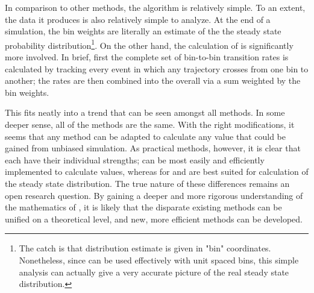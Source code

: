 In comparison to other  methods, the  algorithm is relatively simple. To an extent, the data it produces is also relatively simple to analyze. At the end of a  simulation, the bin weights are literally an estimate of the the steady state probability distribution\footnote{The catch is that distribution estimate is given in "bin" coordinates. Nonetheless, since  can be used effectively with unit spaced bins\supercite{Zhang:2010kfa}, this simple analysis can actually give a very accurate picture of the real steady state distribution.}. On the other hand, the calculation of  is significantly more involved. In brief, first the complete set of bin-to-bin transition rates is calculated by tracking every event in which any trajectory crosses from one bin to another; the rates are then combined into the overall  via a sum weighted by the bin weights\supercite{Donovan:2013gz,Adelman:2013ii,Feng:2015gl}.

This fits neatly into a trend that can be seen amongst all  methods. In some deeper sense, all of the  methods are the same\supercite{Tempkin:2016uf,Lie:2017be}. With the right modifications, it seems that any  method can be adapted to calculate any value that could be gained from unbiased simulation. As practical methods, however, it is clear that each have their individual strengths;  can be most easily and efficiently implemented to calculate  values, whereas for  and  are best suited for calculation of the steady state distribution. The true nature of these differences remains an open research question. By gaining a deeper and more rigorous understanding of the mathematics of , it is likely that the disparate existing methods can be unified on a theoretical level, and new, more efficient methods can be developed.


